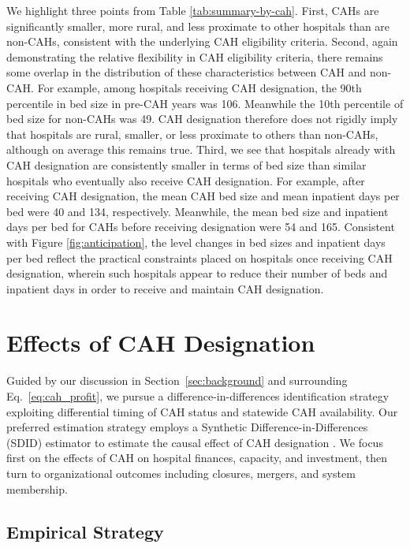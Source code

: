 \documentclass[a4paper, 12pt, twoside]{article}
\begin{document}
We highlight three points from Table \ref{tab:summary-by-cah}. First, CAHs are significantly smaller, more rural, and less proximate to other hospitals than are non-CAHs, consistent with the underlying CAH eligibility criteria. Second, again demonstrating the relative flexibility in CAH eligibility criteria, there remains some overlap in the distribution of these characteristics between CAH and non-CAH. For example, among hospitals receiving CAH designation, the 90th percentile in bed size in pre-CAH years was 106. Meanwhile the 10th percentile of bed size for non-CAHs was 49. CAH designation therefore does not rigidly imply that hospitals are rural, smaller, or less proximate to others than non-CAHs, although on average this remains true. Third, we see that hospitals already with CAH designation are consistently smaller in terms of bed size than similar hospitals who eventually also receive CAH designation. For example, after receiving CAH designation, the mean CAH bed size and mean inpatient days per bed were 40 and 134, respectively. Meanwhile, the mean bed size and inpatient days per bed for CAHs before receiving designation were 54 and 165. Consistent with Figure \ref{fig:anticipation}, the level changes in bed sizes and inpatient days per bed reflect the practical constraints placed on hospitals once receiving CAH designation, wherein such hospitals appear to reduce their number of beds and inpatient days in order to receive and maintain CAH designation.

\section{Effects of CAH Designation}
\label{sec:design}

Guided by our discussion in Section~\ref{sec:background} and surrounding Eq.~\eqref{eq:cah_profit}, we pursue a difference-in-differences identification strategy exploiting differential timing of CAH status and statewide CAH availability. Our preferred estimation strategy employs a Synthetic Difference-in-Differences (SDID) estimator to estimate the causal effect of CAH designation \citep{arkhangelsky2021}. We focus first on the effects of CAH on hospital finances, capacity, and investment, then turn to organizational outcomes including closures, mergers, and system membership.

\subsection{Empirical Strategy}
\label{sec:design-methods}
\end{document}
